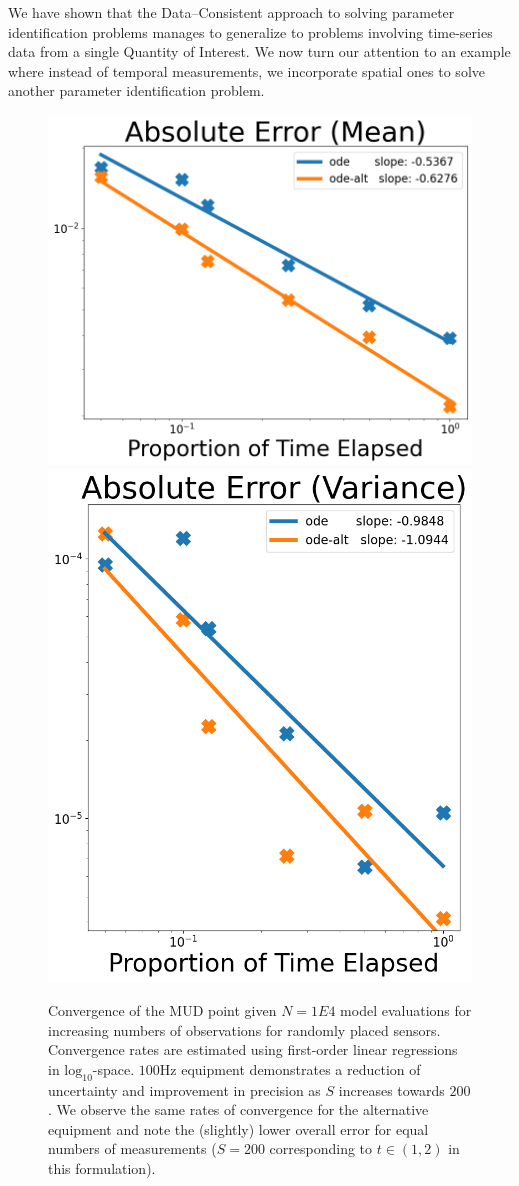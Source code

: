 We have shown that the Data--Consistent approach to solving parameter identification problems manages to generalize to problems involving time-series data from a single Quantity of Interest.
We now turn our attention to an example where instead of temporal measurements, we incorporate spatial ones to solve another parameter identification problem.


\begin{figure}[htbp]
  \centering
  \includegraphics[width=0.475\linewidth]{figures/ode/ode_convergence_mud_obs_mean}
  \includegraphics[width=0.425\linewidth]{figures/ode/ode_convergence_mud_obs_var}

  \caption{Convergence of the MUD point given $N=1E4$ model evaluations for increasing numbers of observations for randomly placed sensors.
  Convergence rates are estimated using first-order linear regressions in $\text{log}_{10}$-space.
  $100$Hz equipment demonstrates a reduction of uncertainty and improvement in precision as $S$ increases towards $200$.
  We observe the same rates of convergence for the alternative equipment and note the (slightly) lower overall error for equal numbers of measurements ($S=200$ corresponding to $t\in (1,2)$ in this formulation).
  }
  \label{fig:ode-convergence-obs}
\end{figure}



